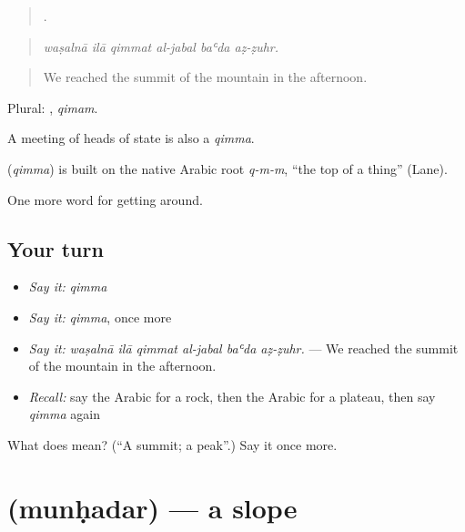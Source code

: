 \begin{quote}
     .
\end{quote}

\begin{quote}
\emph{waṣalnā ilā qimmat al-jabal baʿda aẓ-ẓuhr.}
\end{quote}

\begin{quote}
We reached the summit of the mountain in the afternoon.
\end{quote}

Plural: , \emph{qimam}.

A meeting of heads of state is also a \emph{qimma}.

\begin{cousinweb}
\textbf{} (\emph{qimma}) is built on the native Arabic root \emph{q-m-m}, \textquotedblleft{}the top of a thing\textquotedblright{} (Lane).
\end{cousinweb}

\begin{grammarlens}[title={What you've built}]
One more word for getting around.
\end{grammarlens}

\subsection*{Your turn}
\begin{itemize}
\raggedright
  \item \emph{Say it:} \emph{qimma}
  \item \emph{Say it:} \emph{qimma}, once more
  \item \emph{Say it:} \emph{waṣalnā ilā qimmat al-jabal baʿda aẓ-ẓuhr.} — We reached the summit of the mountain in the afternoon.
  \item \emph{Recall:} say the Arabic for a rock, then the Arabic for a plateau, then say \emph{qimma} again
\end{itemize}

\begin{tcolorbox}[breakable,colback=teal!4,colframe=teal!35!black,title={Before you move on}]
What does  mean? (\textquotedblleft{}A summit; a peak\textquotedblright{}.) Say it once more.
\end{tcolorbox}
\section[\texorpdfstring{\ar{منحدر} (munḥadar)}{منحدر (munḥadar)}]{ (munḥadar) — a slope}

